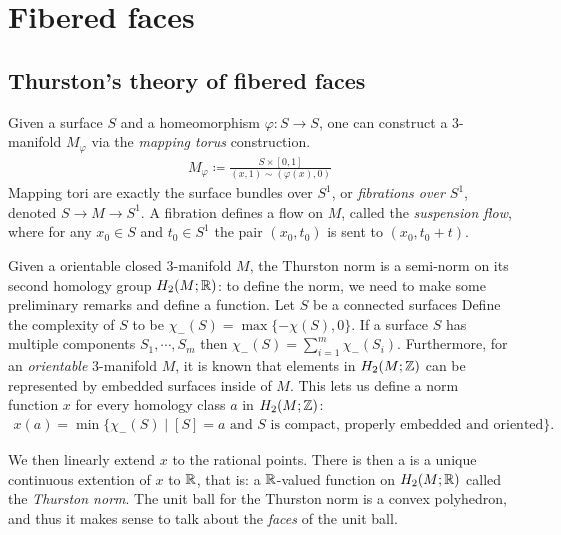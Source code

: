 \section{Fibered faces}
\label{sec:fibered-faces}

\subsection{Thurston's theory of fibered faces}
\label{sec:thurst-fiber-face}

 Given a surface $S$ and a homeomorphism $\varphi: S \to S$, one can construct a $3$-manifold $M_\varphi$ via
the \emph{mapping torus} construction.
\begin{align*}
  M_\varphi \coloneqq \frac{S \times [0,1]}{(x,1) \sim (\varphi(x), 0)}
\end{align*}
Mapping tori are exactly the surface bundles over $S^1$, or \emph{fibrations over $S^1$}, denoted $S\rightarrow M\rightarrow S^1$. A fibration defines a {flow} on $M$,
called the \emph{suspension flow}, where for any $x_0\in S$ and $t_0\in S^1$ the pair $(x_0,t_0)$ is sent to $(x_0,t_0+t)$. %

Given a orientable closed $3$-manifold $M$, the Thurston norm is a semi-norm on its second homology
group $H_2(M; \mathbb{R})$: to define the norm, we need to make some preliminary remarks and define a
function.  Let $S$ be a connected surfaces  Define the complexity of $S$ to be $\chi_-(S) = \max\{-\chi(S),0\}$. If a
surface $S$ has multiple components $S_1,\cdots,S_m$ then $\chi_-(S)=\displaystyle\sum_{i=1}^m\chi_-(S_i)$.  Furthermore, for an \emph{orientable} 3-manifold $M$, it is known that
elements in $H_2(M ; \mathbb{Z})$ can be represented by embedded surfaces inside of $M$. This lets us
define a norm function $x$ for every homology class $a$ in $H_2(M; \mathbb{Z})$:
\begin{align*}
  x(a) = \min\{\chi_-(S) \mid [S] = a \text{ and $S$ is compact, properly embedded and oriented}\}.
\end{align*}

We then linearly extend $x$ to the rational points.  There is then a is a unique continuous extention of $x$ to $\mathbb{R}$, that is: a $\mathbb{R}$-valued function on $H_2(M; \mathbb{R})$ called the {\it Thurston norm}. The unit ball for the Thurston norm is a convex polyhedron, and thus it makes
sense to talk about the \emph{faces} of the unit ball.

